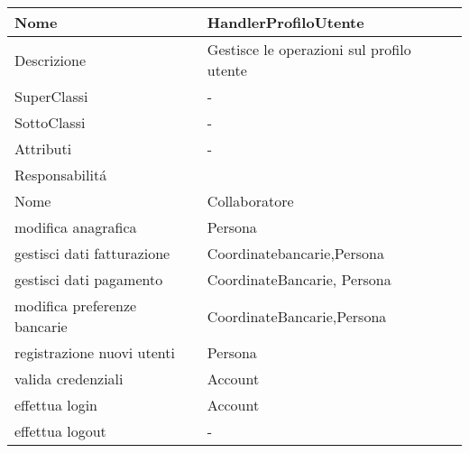 \begin{center} %
    \begin{longtable}{ |p{3cm}|p{3cm}|p{3cm}|p{3cm}| }
        \hline
        Nome & \multicolumn{3}{|p{9cm}|}{HandlerProfiloUtente} \\\hline
        Descrizione & \multicolumn{3}{|p{9cm}|}{Gestisce le operazioni sul profilo utente} \\\hline
        SuperClassi & \multicolumn{3}{|p{9cm}|}{-} \\\hline
        SottoClassi & \multicolumn{3}{|p{9cm}|}{-} \\\hline
        Attributi & \multicolumn{3}{|p{9cm}|}{-} \\\hline
        \multicolumn{4}{|p{12cm}|}{Responsabilit\'a} \\\hline %
        \multicolumn{2}{|p{6cm}|}{Nome} & \multicolumn{2}{|p{6cm}|}{Collaboratore} \\\hline %
        \multicolumn{2}{|p{6cm}|}{modifica anagrafica} & \multicolumn{2}{|p{6cm}|}{Persona} \\\hline
        \multicolumn{2}{|p{6cm}|}{gestisci dati fatturazione} & \multicolumn{2}{|p{6cm}|}{Coordinatebancarie,Persona} \\\hline
        \multicolumn{2}{|p{6cm}|}{gestisci dati pagamento} & \multicolumn{2}{|p{6cm}|}{CoordinateBancarie, Persona} \\\hline
        \multicolumn{2}{|p{6cm}|}{modifica preferenze bancarie} & \multicolumn{2}{|p{6cm}|}{CoordinateBancarie,Persona} \\\hline
        \multicolumn{2}{|p{6cm}|}{registrazione nuovi utenti} & \multicolumn{2}{|p{6cm}|}{Persona} \\\hline
        \multicolumn{2}{|p{6cm}|}{valida credenziali} & \multicolumn{2}{|p{6cm}|}{Account} \\\hline
        \multicolumn{2}{|p{6cm}|}{effettua login} & \multicolumn{2}{|p{6cm}|}{Account} \\\hline
        \multicolumn{2}{|p{6cm}|}{effettua logout} & \multicolumn{2}{|p{6cm}|}{-} \\\hline
    \end{longtable}
\end{center}

